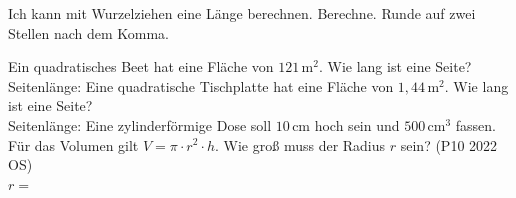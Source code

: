 \begin{aufgabe}{Ich kann mit Wurzelziehen eine Länge berechnen.}
Berechne. Runde auf zwei Stellen nach dem Komma.
\begin{teile}
\teil Ein quadratisches Beet hat eine Fläche von $121\,\text{m}^2$. Wie lang ist eine Seite? \\ Seitenlänge: \leerfeld[m]
\teil Eine quadratische Tischplatte hat eine Fläche von $1{,}44\,\text{m}^2$. Wie lang ist eine Seite? \\ Seitenlänge: \leerfeld[m]
\teil Eine zylinderförmige Dose soll $10\,\text{cm}$ hoch sein und $500\,\text{cm}^3$ fassen. Für das Volumen gilt $V = \pi \cdot r^2 \cdot h$. Wie groß muss der Radius $r$ sein? (P10 2022 OS) \\ $r = {}$ \leerfeld[cm]
\end{teile}


\end{aufgabe}
